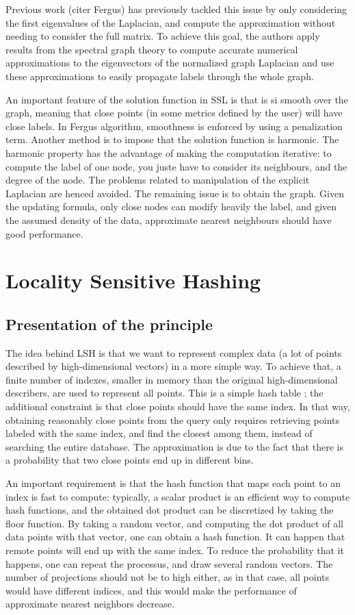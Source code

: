 \documentclass{article} %
\begin{document}
Previous work (citer Fergus) has previously tackled this issue by only considering the first eigenvalues of the Laplacian, and compute the approximation without needing to consider the full matrix. To achieve this goal, the authors apply results from the spectral graph theory to compute accurate numerical approximations to the eigenvectors of the normalized
graph Laplacian and use these approximations to easily propagate labels through the whole graph. 

An important feature of the solution function in SSL is that is si smooth over the graph, meaning that close points (in some metrics defined by the user) will have close labels. In Fergus algorithm, smoothness is enforced by using a penalization term. Another method is to impose that the solution function is harmonic. The harmonic property has the advantage of making the computation iterative: to compute the label of one node, you juste have to consider its neighbours, and the degree of the node. The problems related to manipulation of the explicit Laplacian are henced avoided. The remaining issue is to obtain the graph. Given the updating formula, only close nodes can modify heavily the label, and given the assumed density of the data, approximate nearest neighbours should have good performance.

\section{Locality Sensitive Hashing}
\subsection{Presentation of the principle}
The idea behind LSH is that we want to represent complex data (a lot of points described by high-dimensional vectors) in a more simple way. To achieve that, a finite number of indexes, smaller in memory than the original high-dimensional describers, are used to represent all points. This is a simple hash table ; the additional constraint is that close points should have the same index. In that way, obtaining reasonably close points from the query only requires retrieving points labeled with the same index, and find the closest among them, instead of searching the entire database. The approximation is due to the fact that there is a probability that two close points end up in different bins.

An important requirement is that the hash function that maps each point to an index is fast to compute: typically, a scalar product is an efficient way to compute hash functions, and the obtained dot product can be discretized by taking the floor function. By taking a random vector, and computing the dot product of all data points with that vector, one can obtain a hash function. It can happen that remote points will end up with the same index. To reduce the probability that it happens, one can repeat the processus, and draw several random vectors. The number of projections should not be to high either, as in that case, all points would have different indices, and this would make the performance of approximate nearest neighbors decrease.
\end{document}

